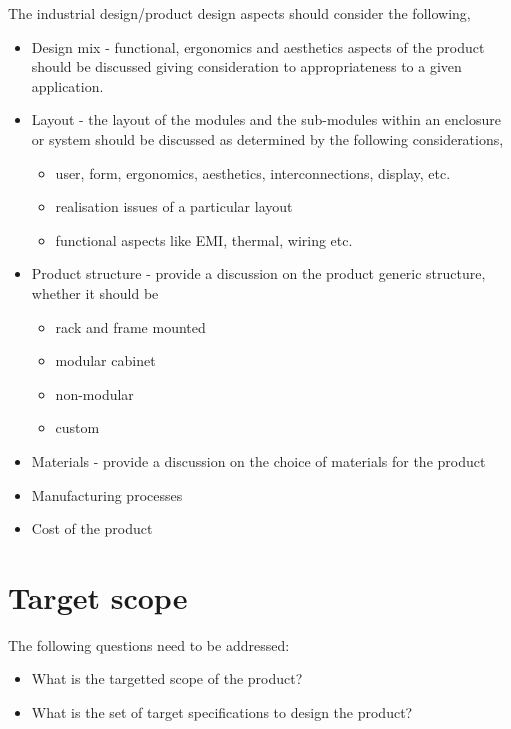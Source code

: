 The industrial design/product design aspects should consider the following,
\begin{itemize}
\item Design mix - functional, ergonomics and aesthetics aspects of the
product should be discussed giving consideration to appropriateness
to a given application.
\item Layout - the layout of the modules and the sub-modules within an enclosure
or system should be discussed as determined by the following considerations,

\begin{itemize}
\item user, form, ergonomics, aesthetics, interconnections, display, etc.
\item realisation issues of a particular layout
\item functional aspects like EMI, thermal, wiring etc.
\end{itemize}
\item Product structure - provide a discussion on the product generic structure,
whether it should be

\begin{itemize}
\item rack and frame mounted 
\item modular cabinet
\item non-modular
\item custom 
\end{itemize}
\item Materials - provide a discussion on the choice of materials for the
product
\item Manufacturing processes
\item Cost of the product
\end{itemize}

\section{Target scope}

The following questions need to be addressed:
\begin{itemize}
\item What is the targetted scope of the product?
\item What is the set of target specifications to design the product?
\end{itemize}

